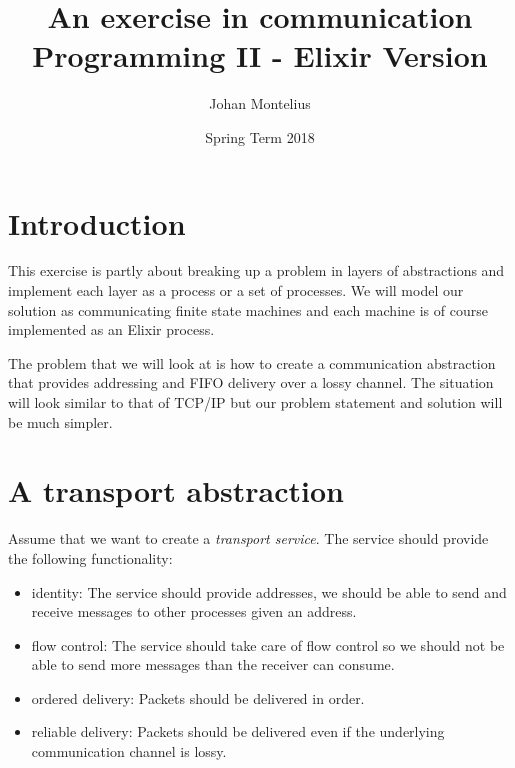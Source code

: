 \documentclass[a4paper,11pt]{article}
\begin{document}
\title{
    \textbf{An exercise in communication}\\
    \large{Programming II - Elixir Version}
}
\author{Johan Montelius}
\date{Spring Term 2018}
\maketitle
{}

\section*{Introduction}

This exercise is partly about breaking up a problem in layers of
abstractions and implement each layer as a process or a set of
processes. We will model our solution as communicating finite state
machines and each machine is of course implemented as an Elixir
process.

The problem that we will look at is how to create a communication
abstraction that provides addressing and FIFO delivery over a lossy
channel. The situation will look similar to that of TCP/IP but our
problem statement and solution will be much simpler.

\section{A transport abstraction}

Assume that we want to create a {\em transport service}. The service
should provide the following functionality:

\begin{itemize}

\item identity: The service should provide addresses, we should
  be able to send and receive messages to other processes given an
  address.

\item flow control: The service should take care of flow control so
  we should not be able to send more messages than the receiver can
  consume.

\item ordered delivery: Packets should be delivered in order.

\item reliable delivery: Packets should be delivered even if the
  underlying communication channel is lossy.

\end{itemize}
\end{document}
